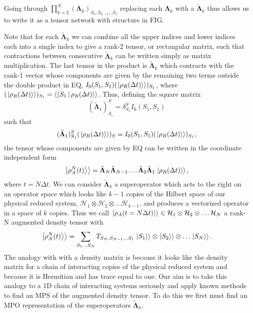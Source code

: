 \documentclass[a4paper, aps, pra,twocolumn]{revtex4-1}
\newcommand{\dket}[1]{\left.\Ket{#1}\right\rangle}
\newcommand{\dbraket}[1]{\left\langle\Braket{#1}\right\rangle}
\begin{document}
Going through $\prod_{k=2}^{N}(\mathbf{\Lambda}_k)_{S_k, S_{k-1} \ldots S_{1}}$ replacing each $\mathbf{\Lambda}_k$ with a $\tilde{\mathbf{\Lambda}}_k$ thus allows us to write it as a tensor network with structure in FIG. 

Note that for each $\tilde{\mathbf{\Lambda}}_k$ we can combine all the upper indices and lower indices each into a single index to give a rank-2 tensor, or rectangular matrix, such that contractions between consecutive $\tilde{\mathbf{\Lambda}}_k$ can be written simply as matrix multiplication. 
The last tensor in the product is $\tilde{\mathbf{\Lambda}}_k$ which contracts with the rank-1 vector whose components are given by the remaining two terms outside the double product in EQ, $I_0(S_1,S_1)(\dket{\rho_R(\Delta t)})_{S_1}$, where $(\dket{\rho_R(\Delta t)})_{S_1}=\dbraket{S_1|\rho_R(\Delta t)}$.
Thus, defining the square matrix
\begin{equation}
 (\tilde{\mathbf{\Lambda}}_1)_{S_1}^S=\delta_{S_1}^S I_0(S_1,S_1)
\end{equation}
such that
\begin{equation}
 (\tilde{\mathbf{\Lambda}}_1)_{S_1}^S(\dket{\rho_R(\Delta t)})_{S}=I_0(S_1,S_1)(\dket{\rho_R(\Delta t)})_{S_1},
\end{equation}
the tensor whose components are given by EQ can be written in the coordinate independent form
\begin{equation}
\dket{\rho_A^N(t)}= \tilde{\mathbf{\Lambda}}_N \tilde{\mathbf{\Lambda}}_{N-1} \ldots \tilde{\mathbf{\Lambda}}_{2}\tilde{\mathbf{\Lambda}}_{1}\dket{\rho_R(\Delta t)},
\end{equation}
where $t= N\Delta t$.
We can consider $\tilde{\mathbf{\Lambda}}_{k}$ a superoperator which acts to the right on an operator space which looks like $k-1$ copies of the Hilbert space of our physical reduced system, $\mathcal{H}_1 \otimes \mathcal{H}_2 \otimes \ldots \mathcal{H}_{k-1} $, and produces a vectorized operator in a space of $k$ copies. Thus we call $\dket{\rho_A(t=N\Delta t)} \in \mathcal{H}_1 \otimes \mathcal{H}_2 \otimes \ldots \mathcal{H}_{N}$ a rank-N augmented density tensor with
\begin{equation}
\dket{\rho^N_A(t)}= \sum_{S_1...S_N} T_{S_N, S_{N-1} \ldots S_1 }\dket{S_1}\otimes \dket{S_2} \otimes \ldots \dket{S_N}.
\end{equation}
The analogy with with a density matrix is because it looks like the density matrix for a chain of interacting copies of the physical reduced system and because it is Hermitian and has trace equal to one.
Our aim is to take this analogy to a 1D chain of interacting systems seriously and apply known methods to find an MPS of the augmented density tensor.
To do this we first must find an MPO representation of the superoperators $\tilde{\mathbf{\Lambda}}_{k}$.
\end{document}
